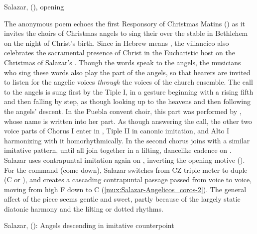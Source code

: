 {Salazar,  (),
opening}

The anonymous poem echoes the first Responsory of Christmas Matins
() as it invites the choirs of Christmas
angels to sing their  over the stable in Bethlehem on the night
of Christ's birth.
Since  in Hebrew means , the
villancico also celebrates the sacramental presence of Christ in the
Eucharistic host on the Christmas of Salazar's .
Though the words speak to the angels, the musicians who sing these words also
play the part of the angels, so that hearers are invited to listen for the
angelic voices \emph{through} the voices of the church ensemble. 
The call to the angels is sung first by the Tiple I, in a gesture beginning
with a rising fifth and then falling by step, as though looking up to the
heavens and then following the angels' descent.
In the Puebla convent choir, this part was performed by ,
whose name is written into her part.
As though answering the call, the other two voice parts of Chorus I enter in
, Tiple II in canonic imitation, and Alto I harmonizing with it
homorhythmically. 
In  the second chorus joins with a similar imitative
pattern, until all join together in a lilting, dancelike cadence on
.
Salazar uses contrapuntal imitation again on ,
inverting the opening motive ().
For the command  (come down), Salazar switches from CZ
triple meter to duple (C or ), and creates a cascading
contrapuntal passage passed from voice to voice, moving from high F
down to C (\cref{mux:Salazar-Angelicos_coros-2}).
The general affect of the piece seems gentle and sweet, partly because of the
largely static diatonic harmony and the lilting or dotted rhythms.

{Salazar,  ():
Angels descending in imitative counterpoint}

